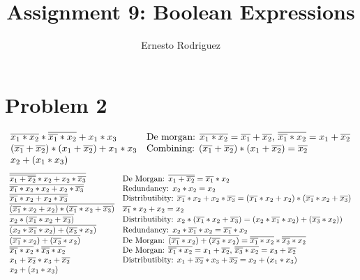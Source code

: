 \documentclass[11pt]{article}
\author{Ernesto Rodriguez}
\title{Assignment 9: Boolean Expressions}
\begin{document}
\maketitle

\section{Problem 2}

\[
\begin{array}{l l}
  \overline{x_1*x_2}*\overline{\overline{x_1}*x_2}+x_1*x_3 & \textrm{De morgan: $\overline{x_1*x_2}=\overline{x_1}+\overline{x_2}$, $\overline{\overline{x_1}*x_2}=x_1+\overline{x_2}$}\\
  (\overline{x_1}+\overline{x_2})*(x_1+\overline{x_2})+x_1*x_3 & \textrm{Combining: $(\overline{x_1}+\overline{x_2})*(x_1+\overline{x_2})=\overline{x_2}$}\\
  x_2+(x_1*x_3)\\
\end{array}
\]
\[
\begin{array}{l l}
  \overline{\overline{x_1+\overline{x_2}}*x_2+x_2*\overline{x_3}} & \textrm{De Morgan: $\overline{x_1+\overline{x_2}}=\overline{x_1}*{x_2}$} \\
  \overline{\overline{x_1}*x_2*x_2+x_2*\overline{x_3}} & \textrm{Redundancy: $x_2*x_2=x_2$} \\
  \overline{\overline{x_1}*x_2+x_2*\overline{x_3}} & \textrm{Distributibity: $\overline{x_1}*x_2+x_2*\overline{x_3}=(\overline{x_1}*x_2+x_2)*(\overline{x_1}*x_2+\overline{x_3})$} \\
  \overline{(\overline{x_1}*x_2+x_2)*(\overline{x_1}*x_2+\overline{x_3})} & \textrm{$\overline{x_1}*x_2+x_2=x_2$}\\
  \overline{x_2 * (\overline{x_1}*x_2+\overline{x_3})} & \textrm{Distributibity: $x_2 * (\overline{x_1}*x_2+\overline{x_3})=(x_2*\overline{x_1}*x_2)+(\overline{x_3}*x_2))$} \\
  \overline{(x_2*\overline{x_1}*x_2)+(\overline{x_3}*x_2)} & \textrm{Redundancy: $x_2*\overline{x_1}*x_2=\overline{x_1}*x_2$} \\
  \overline{(\overline{x_1}*x_2)+(\overline{x_3}*x_2)} & \textrm{De Morgan: $\overline{(\overline{x_1}*x_2)+(\overline{x_3}*x_2)}=\overline{\overline{x_1}*x_2}*\overline{\overline{x_3}*x_2}$}\\
  \overline{\overline{x_1}*x_2}*\overline{\overline{x_3}*x_2} & \textrm{De Morgan: $\overline{\overline{x_1}*x_2}=x_1+\overline{x_2}$, $\overline{\overline{x_3}*x_2}=x_3+\overline{x_2}$} \\
  x_1+\overline{x_2}*x_3+\overline{x_2} & \textrm{Distributibity: $x_1+\overline{x_2}*x_3+\overline{x_2}=x_2+(x_1*x_3)$} \\
  x_2+(x_1*x_3)\\
\end{array}
\]
\end{document}
